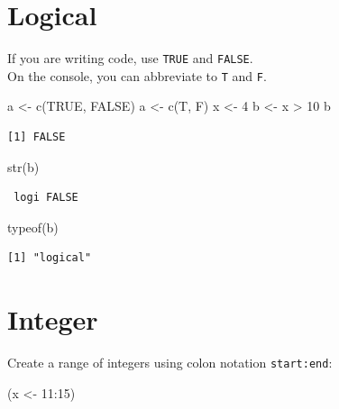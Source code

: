 \documentclass[
]{book}
\newenvironment{Shaded}{\begin{snugshade}}{\end{snugshade}}
\newcommand{\ConstantTok}[1]{\textcolor[rgb]{0.00,0.00,0.00}{#1}}
\newcommand{\DecValTok}[1]{\textcolor[rgb]{0.00,0.00,0.81}{#1}}
\newcommand{\FunctionTok}[1]{\textcolor[rgb]{0.00,0.00,0.00}{#1}}
\newcommand{\NormalTok}[1]{#1}
\newcommand{\OtherTok}[1]{\textcolor[rgb]{0.56,0.35,0.01}{#1}}
\newcommand{\SpecialCharTok}[1]{\textcolor[rgb]{0.00,0.00,0.00}{#1}}
\begin{document}
\hypertarget{logical}{%
\section{Logical}\label{logical}}

If you are writing code, use \texttt{TRUE} and \texttt{FALSE}.\\
On the console, you can abbreviate to \texttt{T} and \texttt{F}.

\begin{Shaded}
\begin{Highlighting}[]
\NormalTok{a }\OtherTok{\textless{}{-}} \FunctionTok{c}\NormalTok{(}\ConstantTok{TRUE}\NormalTok{, }\ConstantTok{FALSE}\NormalTok{)}
\NormalTok{a }\OtherTok{\textless{}{-}} \FunctionTok{c}\NormalTok{(T, F)}
\NormalTok{x }\OtherTok{\textless{}{-}} \DecValTok{4}
\NormalTok{b }\OtherTok{\textless{}{-}}\NormalTok{ x }\SpecialCharTok{\textgreater{}} \DecValTok{10}
\NormalTok{b}
\end{Highlighting}
\end{Shaded}

\begin{verbatim}
[1] FALSE
\end{verbatim}

\begin{Shaded}
\begin{Highlighting}[]
\FunctionTok{str}\NormalTok{(b)}
\end{Highlighting}
\end{Shaded}

\begin{verbatim}
 logi FALSE
\end{verbatim}

\begin{Shaded}
\begin{Highlighting}[]
\FunctionTok{typeof}\NormalTok{(b)}
\end{Highlighting}
\end{Shaded}

\begin{verbatim}
[1] "logical"
\end{verbatim}

\hypertarget{integer}{%
\section{Integer}\label{integer}}

Create a range of integers using colon notation \texttt{start:end}:

\begin{Shaded}
\begin{Highlighting}[]
\NormalTok{(x }\OtherTok{\textless{}{-}} \DecValTok{11}\SpecialCharTok{:}\DecValTok{15}\NormalTok{)}
\end{Highlighting}
\end{Shaded}
\end{document}
